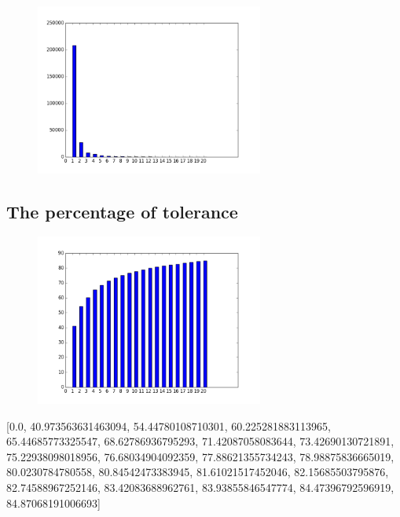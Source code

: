 \documentclass[10pt, conference, compsocconf]{IEEEtran}
\begin{document}
\begin{figure}[H]\centering\includegraphics[width=75mm,scale=0.5]{BasedonCookienumberofusersfingerprint}\end{figure}\subsection{The percentage of tolerance}
\begin{figure}[H]\centering\includegraphics[width=75mm,scale=0.5]{BasedonCookietolerance}\end{figure}[0.0, 40.973563631463094, 54.44780108710301, 60.225281883113965, 65.44685773325547, 68.62786936795293, 71.42087058083644, 73.42690130721891, 75.22938098018956, 76.68034904092359, 77.88621355734243, 78.98875836665019, 80.0230784780558, 80.84542473383945, 81.61021517452046, 82.15685503795876, 82.74588967252146, 83.42083688962761, 83.93855846547774, 84.47396792596919, 84.87068191006693]
\end{document}
